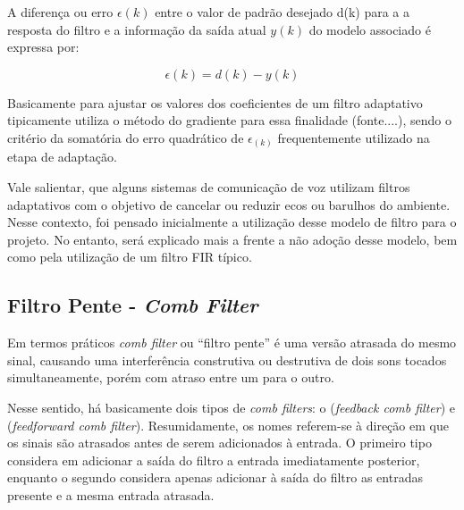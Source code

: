 		A diferença ou erro $\epsilon(k)$ entre o valor de padrão desejado d(k) para a a resposta do filtro e a informação da saída atual $y(k)$ do modelo associado é expressa por:
		
		\begin{equation}
			\label{eq2-filtroadap}
			\epsilon(k) = d(k)- y(k)
		\end{equation}
		
		Basicamente para ajustar os valores dos coeficientes de um filtro adaptativo tipicamente utiliza o método do gradiente para essa finalidade (fonte....), sendo o critério da somatória do erro quadrático de $\epsilon_(k)$ frequentemente utilizado na etapa de adaptação.
		
		Vale salientar, que alguns sistemas de comunicação de voz utilizam filtros adaptativos com o objetivo de cancelar ou reduzir ecos ou barulhos do ambiente. Nesse contexto, foi pensado inicialmente a utilização desse modelo de filtro para o projeto. No entanto, será explicado mais a frente a não adoção desse modelo, bem como pela utilização de um filtro FIR típico.
		
	\subsection{Filtro Pente - \textit{Comb Filter}}
	\label{comb-filter}
		
		Em termos práticos \textit{comb filter} ou “filtro pente” é uma versão atrasada do mesmo sinal, causando uma  interferência construtiva ou destrutiva de dois sons tocados simultaneamente, porém com atraso entre um para o outro. 
		
		Nesse sentido, há basicamente dois tipos de \textit{comb filters}: o (\textit{feedback comb filter}) e (\textit{feedforward comb filter}). Resumidamente, os nomes referem-se à direção em que os sinais são atrasados antes de serem adicionados à entrada. O primeiro tipo considera em adicionar a saída do filtro a entrada imediatamente posterior, enquanto o segundo considera apenas adicionar à saída do filtro as entradas presente e a mesma entrada atrasada.
		
